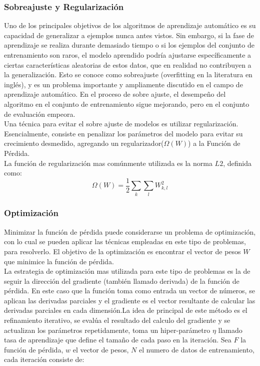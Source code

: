 \documentclass[a4paper,11pt,spanish]{book}
\begin{document}
	\subsubsection {Sobreajuste y Regularización}
	  Uno de los principales objetivos de los algoritmos de aprendizaje automático es su capacidad de generalizar a ejemplos nunca antes vistos. Sin embargo, si la fase
	  de aprendizaje se realiza durante demasiado tiempo o si los ejemplos del conjunto de entrenamiento son raros, el modelo aprendido podría ajustarse específicamente
	  a ciertas características aleatorias de estos datos, que en realidad no contribuyen a la generalización. Esto se conoce como sobreajuste (overfitting en la literatura en inglés),
	  y es un problema importante y ampliamente discutido en el campo de aprendizaje automático. En el proceso de sobre ajuste, el desempeño del algoritmo en el
	  conjunto de entrenamiento sigue mejorando, pero en el conjunto de evaluación empeora.\\
	  Una técnica para evitar el sobre ajuste de modelos es utilizar regularización. Esencialmente, consiste en penalizar los parámetros del modelo para evitar su
	  crecimiento desmedido, agregando un regularizador($\Omega(W)$) a la Función de Pérdida. \\
	  La función de regularización mas comúnmente utilizada es la norma $L2$, definida como:
	   \begin{equation}
	    \Omega(W) = \frac{1}{2} {\sum_{k} {\sum_{l}} W_{k,l}^2}
	   \end{equation}

    \subsubsection{Optimización}
      Minimizar la función de pérdida puede considerarse un problema de optimización, con lo cual se pueden aplicar las técnicas empleadas en este tipo de problemas, para resolverlo.
      El objetivo de la optimización es encontrar el vector de pesos $W$ que minimice la función de pérdida.\\
      La estrategia de optimización mas utilizada para este tipo de problemas es la de seguir la dirección del gradiente (también llamado derivada) de la función de pérdida.
      En este caso que la función toma como entrada un vector de números, se aplican las derivadas parciales y el gradiente es el vector resultante de calcular las derivadas parciales
      en cada dimensión.La idea de principal de este método es el refinamiento iterativo, se evalúa el resultado del calculo del gradiente y se actualizan los parámetros repetidamente,
      toma un hiper-parámetro $\eta$ llamado tasa de aprendizaje que define el tamaño de cada paso en la iteración.
      Sea $F$ la función de pérdida, $w$ el vector de pesos, $N$ el numero de datos de entrenamiento, cada iteración consiste de:
\end{document}
